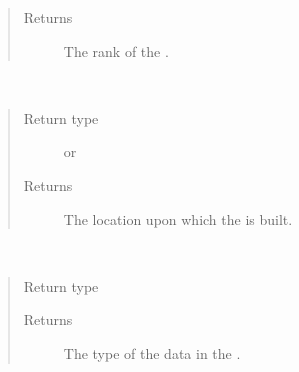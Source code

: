 \documentclass[letterpaper,10pt,english]{sphinxmanual}
\begin{document}
\begin{fulllineitems}
\begin{fulllineitems}
\begin{quote}
\begin{description}
\item[{Returns}] \leavevmode
The rank of the {\hyperref[\detokenize{field:ESMF.api.field.Field}]{}}.

\end{description}\end{quote}

\end{fulllineitems}


\begin{fulllineitems}
\label{\detokenize{field:ESMF.api.field.Field.staggerloc}}~\begin{quote}\begin{description}
\item[{Return type}] \leavevmode
{\hyperref[\detokenize{StaggerLoc:ESMF.api.constants.StaggerLoc}]{}} or
{\hyperref[\detokenize{MeshLoc:ESMF.api.constants.MeshLoc}]{}}

\item[{Returns}] \leavevmode
The location upon which the {\hyperref[\detokenize{field:ESMF.api.field.Field}]{}}
is built.

\end{description}\end{quote}

\end{fulllineitems}


\begin{fulllineitems}
\label{\detokenize{field:ESMF.api.field.Field.type}}~\begin{quote}\begin{description}
\item[{Return type}] \leavevmode
{\hyperref[\detokenize{TypeKind:ESMF.api.constants.TypeKind}]{}}

\item[{Returns}] \leavevmode
The type of the data in the {\hyperref[\detokenize{field:ESMF.api.field.Field}]{}}.


\end{description}
\end{quote}
\end{fulllineitems}
\end{fulllineitems}
\end{document}
